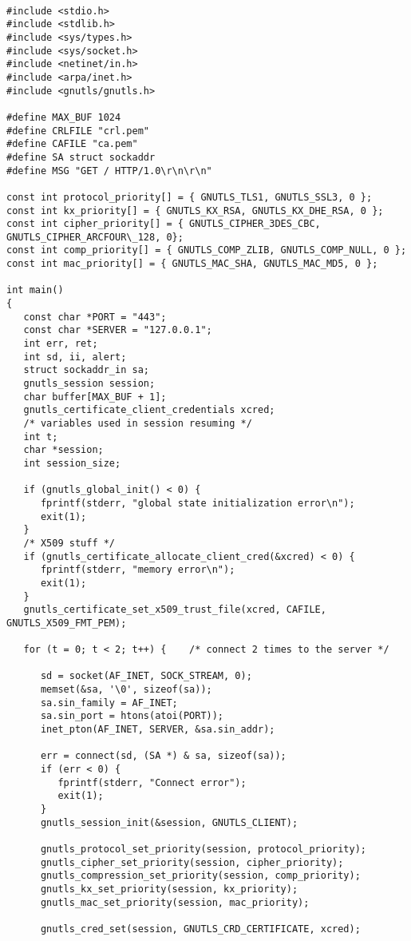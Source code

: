 \begin{verbatim}

#include <stdio.h>
#include <stdlib.h>
#include <sys/types.h>
#include <sys/socket.h>
#include <netinet/in.h>
#include <arpa/inet.h>
#include <gnutls/gnutls.h>

#define MAX_BUF 1024
#define CRLFILE "crl.pem"
#define CAFILE "ca.pem"
#define SA struct sockaddr
#define MSG "GET / HTTP/1.0\r\n\r\n"

const int protocol_priority[] = { GNUTLS_TLS1, GNUTLS_SSL3, 0 };
const int kx_priority[] = { GNUTLS_KX_RSA, GNUTLS_KX_DHE_RSA, 0 };
const int cipher_priority[] = { GNUTLS_CIPHER_3DES_CBC, GNUTLS_CIPHER_ARCFOUR\_128, 0};
const int comp_priority[] = { GNUTLS_COMP_ZLIB, GNUTLS_COMP_NULL, 0 };
const int mac_priority[] = { GNUTLS_MAC_SHA, GNUTLS_MAC_MD5, 0 };

int main()
{
   const char *PORT = "443";
   const char *SERVER = "127.0.0.1";
   int err, ret;
   int sd, ii, alert;
   struct sockaddr_in sa;
   gnutls_session session;
   char buffer[MAX_BUF + 1];
   gnutls_certificate_client_credentials xcred;
   /* variables used in session resuming */
   int t;
   char *session;
   int session_size;

   if (gnutls_global_init() < 0) {
      fprintf(stderr, "global state initialization error\n");
      exit(1);
   }
   /* X509 stuff */
   if (gnutls_certificate_allocate_client_cred(&xcred) < 0) {
      fprintf(stderr, "memory error\n");
      exit(1);
   }
   gnutls_certificate_set_x509_trust_file(xcred, CAFILE, GNUTLS_X509_FMT_PEM);

   for (t = 0; t < 2; t++) {    /* connect 2 times to the server */

      sd = socket(AF_INET, SOCK_STREAM, 0);
      memset(&sa, '\0', sizeof(sa));
      sa.sin_family = AF_INET;
      sa.sin_port = htons(atoi(PORT));
      inet_pton(AF_INET, SERVER, &sa.sin_addr);

      err = connect(sd, (SA *) & sa, sizeof(sa));
      if (err < 0) {
         fprintf(stderr, "Connect error");
         exit(1);
      }
      gnutls_session_init(&session, GNUTLS_CLIENT);

      gnutls_protocol_set_priority(session, protocol_priority);
      gnutls_cipher_set_priority(session, cipher_priority);
      gnutls_compression_set_priority(session, comp_priority);
      gnutls_kx_set_priority(session, kx_priority);
      gnutls_mac_set_priority(session, mac_priority);

      gnutls_cred_set(session, GNUTLS_CRD_CERTIFICATE, xcred);


\end{verbatim}
